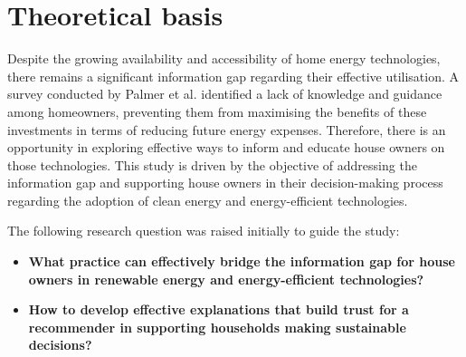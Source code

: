 \section{Theoretical basis}

Despite the growing availability and accessibility of home energy technologies, there remains a significant information gap regarding their effective utilisation. 
A survey conducted by Palmer et al. \cite{informationgap} identified a lack of knowledge and guidance among homeowners, preventing them from maximising the benefits of these investments in terms of reducing future energy expenses. 
Therefore, there is an opportunity in exploring effective ways to inform and educate house owners on those technologies. 
This study is driven by the objective of addressing the information gap and supporting house owners in their decision-making process regarding the adoption of clean energy and energy-efficient technologies. 



The following research question was raised initially to guide the study: 
\begin{itemize}
  \item \textbf{What practice can effectively bridge the information gap for house owners in renewable energy and energy-efficient technologies?}
\end{itemize}

\begin{itemize}
  \item \textbf{How to develop effective explanations that build trust for a recommender in supporting households making sustainable decisions? }
\end{itemize}


